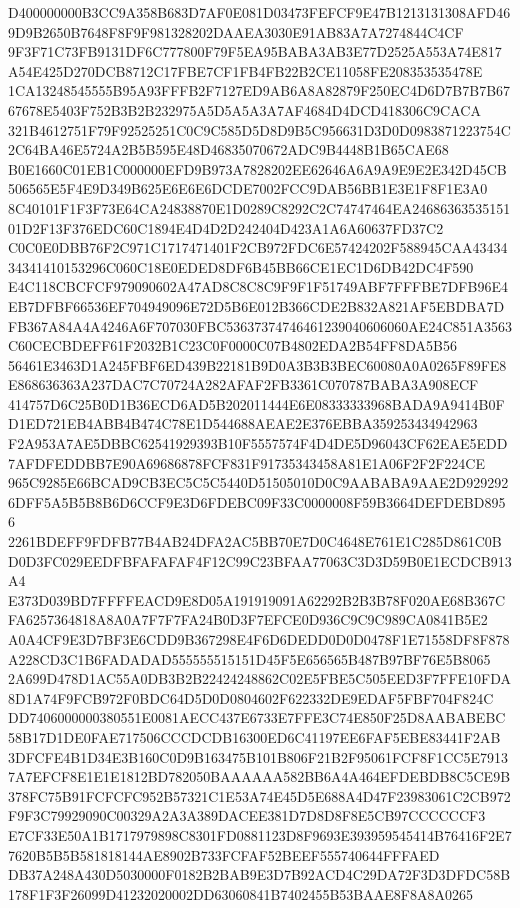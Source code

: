 \documentclass[UTF8,fontset=fandol,zihao=-4,a4paper]{ctexart}
\begin{document}
{{D400000000B3CC9A358B683D7AF0E081D03473FEFCF9E47B1213131308AFD469D9B2650B7648F8F9F981328202DAAEA3030E91AB83A7A7274844C4CF
9F3F71C73FB9131DF6C777800F79F5EA95BABA3AB3E77D2525A553A74E817A54E425D270DCB8712C17FBE7CF1FB4FB22B2CE11058FE208353535478E
1CA13248545555B95A93FFFB2F7127ED9AB6A8A82879F250EC4D6D7B7B7B6767678E5403F752B3B2B232975A5D5A5A3A7AF4684D4DCD418306C9CACA
321B4612751F79F92525251C0C9C585D5D8D9B5C956631D3D0D0983871223754C2C64BA46E5724A2B5B595E48D46835070672ADC9B4448B1B65CAE68
B0E1660C01EB1C000000EFD9B973A7828202EE62646A6A9A9E9E2E342D45CB506565E5F4E9D349B625E6E6E6DCDE7002FCC9DAB56BB1E3E1F8F1E3A0
8C40101F1F3F73E64CA24838870E1D0289C8292C2C74747464EA2468636353515101D2F13F376EDC60C1894E4D4D2D242404D423A1A6A60637FD37C2
C0C0E0DBB76F2C971C1717471401F2CB972FDC6E57424202F588945CAA4343434341410153296C060C18E0EDED8DF6B45BB66CE1EC1D6DB42DC4F590
E4C118CBCFCF979090602A47AD8C8C8C9F9F1F51749ABF7FFFBE7DFB96E4EB7DFBF66536EF704949096E72D5B6E012B366CDE2B832A821AF5EBDBA7D
FB367A84A4A4246A6F707030FBC53637374746461239040606060AE24C851A3563C60CECBDEFF61F2032B1C23C0F0000C07B4802EDA2B54FF8DA5B56
56461E3463D1A245FBF6ED439B22181B9D0A3B3B3BEC60080A0A0265F89FE8E868636363A237DAC7C70724A282AFAF2FB3361C070787BABA3A908ECF
414757D6C25B0D1B36ECD6AD5B202011444E6E08333333968BADA9A9414B0FD1ED721EB4ABB4B474C78E1D544688AEAE2E376EBBA359253434942963
F2A953A7AE5DBBC62541929393B10F5557574F4D4DE5D96043CF62EAE5EDD7AFDFEDDBB7E90A69686878FCF831F91735343458A81E1A06F2F2F224CE
965C9285E66BCAD9CB3EC5C5C5440D51505010D0C9AABABA9AAE2D9292926DFF5A5B5B8B6D6CCF9E3D6FDEBC09F33C0000008F59B3664DEFDEBD8956
2261BDEFF9FDFB77B4AB24DFA2AC5BB70E7D0C4648E761E1C285D861C0BD0D3FC029EEDFBFAFAFAF4F12C99C23BFAA77063C3D3D59B0E1ECDCB913A4
E373D039BD7FFFFEACD9E8D05A191919091A62292B2B3B78F020AE68B367CFA6257364818A8A0A7F7F7FA24B0D3F7EFCE0D936C9C9C989CA0841B5E2
A0A4CF9E3D7BF3E6CDD9B367298E4F6D6DEDD0D0D0478F1E71558DF8F878A228CD3C1B6FADADAD555555515151D45F5E656565B487B97BF76E5B8065
2A699D478D1AC55A0DB3B2B22424248862C02E5FBE5C505EED3F7FFE10FDA8D1A74F9FCB972F0BDC64D5D0D0804602F622332DE9EDAF5FBF704F824C
DD7406000000380551E0081AECC437E6733E7FFE3C74E850F25D8AABABEBC58B17D1DE0FAE717506CCCDCDB16300ED6C41197EE6FAF5EBE83441F2AB
3DFCFE4B1D34E3B160C0D9B163475B101B806F21B2F95061FCF8F1CC5E79137A7EFCF8E1E1E1812BD782050BAAAAAA582BB6A4A464EFDEBDB8C5CE9B
378FC75B91FCFCFC952B57321C1E53A74E45D5E688A4D47F23983061C2CB972F9F3C79929090C00329A2A3A389DACEE381D7D8D8F8E5CB97CCCCCCF3
E7CF33E50A1B1717979898C8301FD0881123D8F9693E393959545414B76416F2E77620B5B5B581818144AE8902B733FCFAF52BEEF555740644FFFAED
DB37A248A430D5030000F0182B2BAB9E3D7B92ACD4C29DA72F3D3DFDC58B178F1F3F26099D41232020002DD63060841B7402455B53BAAE8F8A8A0265
}}
\end{document}

